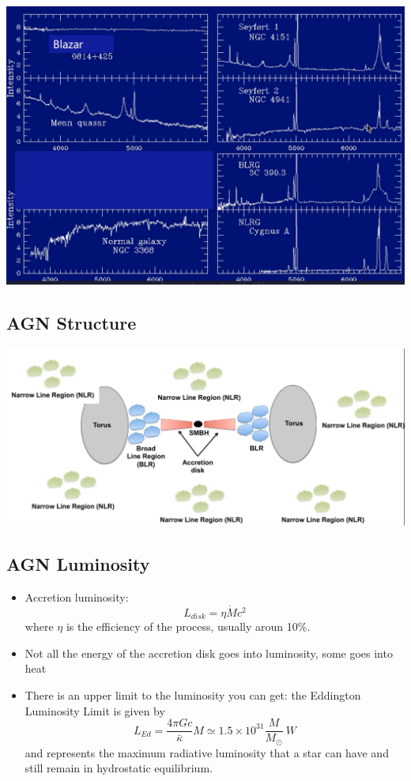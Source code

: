 \documentclass{book}
\begin{document}
\begin{itemize}
\begin{center}
              \includegraphics[height = 0.6 \textwidth]{images/types_agn.png}
          \end{center}
\end{itemize}
\subsection{AGN Structure}
\begin{center}
    \includegraphics[width = \textwidth]{images/agn_structure.png}
\end{center}
\subsection{AGN Luminosity}
\begin{itemize}
    \item Accretion luminosity:
          \begin{equation*}
              L_{disk} = \eta \dot{M} c^2 \tag{C\&O 28.6}
          \end{equation*}
          where $\eta$ is the efficiency of the process, usually aroun 10\%.
    \item Not all the energy of the accretion disk goes into luminosity, some goes into heat
    \item There is an upper limit to the luminosity you can get: the Eddington Luminosity Limit is given by
          \begin{equation*}
              L_{Ed} = \frac{4 \pi G c}{\bar{\kappa}} M  \simeq 1.5 \times 10^{31} \frac{M}{M_\odot}\ W \tag{10.114}
          \end{equation*}
          and represents the maximum radiative luminosity that a star can have and still remain in hydrostatic equilibrium.
\end{itemize}
\end{document}
